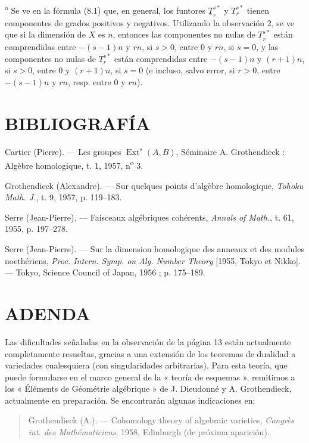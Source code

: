 \documentclass[11pt,twoside,openany]{book}
\numberwithin{equation}{section}
\newcommand{\src}[1]{%
  \phantomsection\hypertarget{src:#1}{}%
  \marginpar{\raggedleft\footnotesize\sffamily #1}%
}
\theoremstyle{plain}
\theoremstyle{definition}
\theoremstyle{remark}
\newcommand{\FgaUnitKey}{frontmatter}
\renewcommand{\src}[1]{%
  \phantomsection\hypertarget{src:\FgaUnitKey:#1}{}%
  \marginpar{\raggedleft\footnotesize\sffamily #1}%
}
\theoremstyle{plain}
\theoremstyle{definition}
\theoremstyle{remark}
\begin{document}
\medskip
{}\textsuperscript{o} Se ve en la fórmula (8.1) que, en general, los
funtores $\underline{T}_{r}^{s*}$ y $T_{r}^{s*}$ tienen componentes de
grados positivos y negativos. Utilizando la observación 2, se ve que si la
dimensión de $X$ es $n$, entonces las componentes no nulas de
$\underline{T}_{r}^{s*}$ están comprendidas entre $-(s-1)n$ y $rn$, si $s>0$,
entre $0$ y $rn$, si $s=0$, y las componentes no nulas de $T_{r}^{s*}$
están comprendidas entre $-(s-1)n$ y $(r+1)n$, si $s>0$, entre $0$ y $(r+1)n$,
si $s=0$ (e incluso, salvo error, si $r>0$, entre $-(s-1)n$ y $rn$, resp. entre
$0$ y $rn$).

\section*{BIBLIOGRAFÍA}

\noindent[1] Cartier (Pierre). --- Les groupes
$\operatorname{Ext}^{s}(A,B)$, Séminaire A. Grothendieck : Algèbre homologique,
t. 1, 1957, n\textsuperscript{o} 3.

\noindent[2] Grothendieck (Alexandre). --- Sur quelques points d'algèbre
homologique, \emph{Tohoku Math. J.}, t. 9, 1957, p. 119--183.

\noindent[3] Serre (Jean-Pierre). --- Faisceaux algébriques cohérents,
\emph{Annals of Math.}, t. 61, 1955, p. 197--278.

\noindent[4] Serre (Jean-Pierre). --- Sur la dimension homologique des anneaux
et des modules noethériens, \emph{Proc. Intern. Symp. on Alg. Number Theory}
[1955, Tokyo et Nikko]. --- Tokyo, Science Council of Japan, 1956 ;
p. 175--189.

\clearpage
\src{193}
\section*{ADENDA}

Las dificultades señaladas en la observación de la página 13 están actualmente
completamente resueltas, gracias a una extensión de los teoremas de dualidad a
variedades cualesquiera (con singularidades arbitrarias). Para esta teoría, que puede
formularse en el marco general de la « teoría de esquemas », remitimos
a los « Éléments de Géométrie algébrique » de J. Dieudonné y A. Grothendieck,
actualmente en preparación. Se encontrarán algunas indicaciones en:

\begin{quote}
Grothendieck (A.). --- Cohomology theory of algebraic varieties,
\emph{Congrès int. des Mathématiciens}, 1958, Edinburgh (de próxima aparición).
\end{quote}
\end{document}
